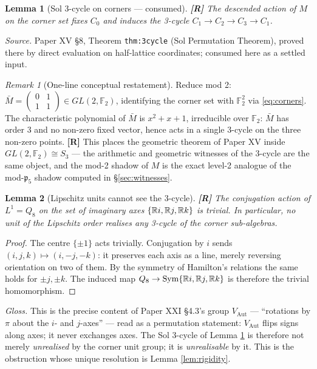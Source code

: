 \documentclass[11pt,a4paper]{article}
\theoremstyle{plain}
\newtheorem{lemma}{Lemma}
\theoremstyle{definition}
\theoremstyle{remark}
\newtheorem{remark}{Remark}
\newcounter{witness}
\newcommand{\FF}[1]{\mathbb{F}_{#1}}
\newcommand{\pfive}{\mathfrak{p}_5}
\newcommand{\rtag}[1]{\textnormal{\textbf{[#1]}}}
\DeclareMathOperator{\Sym}{Sym}
\begin{document}
\begin{lemma}[Sol 3-cycle on corners --- consumed]\label{lem:3cycle}
\rtag{R} The descended action of $M$ on the corner set fixes $C_0$ and induces the 3-cycle $C_1 \to C_2 \to C_3 \to C_1$.
\end{lemma}

\noindent\emph{Source.} Paper XV \S8, Theorem \texttt{thm:3cycle} (Sol Permutation Theorem), proved there by direct evaluation on half-lattice coordinates; consumed here as a settled input.

\begin{remark}[One-line conceptual restatement]\label{rem:mod2}
Reduce mod 2: $\bar M = \left(\begin{smallmatrix}0&1\\1&1\end{smallmatrix}\right) \in GL(2,\FF2)$, identifying the corner set with $\FF2^2$ via \eqref{eq:corners}. The characteristic polynomial of $\bar M$ is $x^2 + x + 1$, irreducible over $\FF2$: $\bar M$ has order 3 and no non-zero fixed vector, hence acts in a single 3-cycle on the three non-zero points. \rtag{R} This places the geometric theorem of Paper XV inside $GL(2,\FF2) \cong S_3$ --- the arithmetic and geometric witnesses of the 3-cycle are the same object, and the mod-2 shadow of $M$ is the exact level-2 analogue of the mod-$\pfive$ shadow computed in \S\ref{sec:witnesses}.
\end{remark}

\begin{lemma}[Lipschitz units cannot see the 3-cycle]\label{lem:blind}
\rtag{R} The conjugation action of $L^1 = Q_8$ on the set of imaginary axes $\{\mathbb{R} i, \mathbb{R} j, \mathbb{R} k\}$ is trivial. In particular, no unit of the Lipschitz order realises any 3-cycle of the corner sub-algebras.
\end{lemma}
\begin{proof}
The centre $\{\pm1\}$ acts trivially. Conjugation by $i$ sends $(i,j,k) \mapsto (i,-j,-k)$: it preserves each axis as a line, merely reversing orientation on two of them. By the symmetry of Hamilton's relations the same holds for $\pm j, \pm k$. The induced map $Q_8 \to \Sym\{\R i, \R j, \R k\}$ is therefore the trivial homomorphism.
\end{proof}

\noindent\emph{Gloss.} This is the precise content of Paper XXI \S4.3's group $V_{\mathrm{Aut}}$ --- ``rotations by $\pi$ about the $i$- and $j$-axes'' --- read as a permutation statement: $V_{\mathrm{Aut}}$ flips signs along axes; it never exchanges axes. The Sol 3-cycle of Lemma \ref{lem:3cycle} is therefore not merely \emph{unrealised} by the corner unit group; it is \emph{unrealisable} by it. This is the obstruction whose unique resolution is Lemma \ref{lem:rigidity}.
\end{document}
